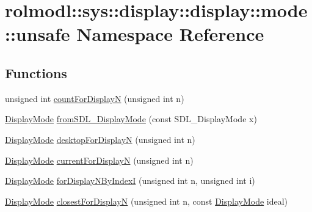 \hypertarget{namespacerolmodl_1_1sys_1_1display_1_1display_1_1mode_1_1unsafe}{}\section{rolmodl\+::sys\+::display\+::display\+::mode\+::unsafe Namespace Reference}
\label{namespacerolmodl_1_1sys_1_1display_1_1display_1_1mode_1_1unsafe}
\subsection*{Functions}
\begin{DoxyCompactItemize}
\item 
unsigned int \mbox{\hyperlink{namespacerolmodl_1_1sys_1_1display_1_1display_1_1mode_1_1unsafe_a44b5325fbd365260f9ad80c6131887b1}{count\+For\+DisplayN}} (unsigned int n)
\item 
\mbox{\hyperlink{structrolmodl_1_1sys_1_1display_1_1display_1_1mode_1_1_display_mode}{Display\+Mode}} \mbox{\hyperlink{namespacerolmodl_1_1sys_1_1display_1_1display_1_1mode_1_1unsafe_aafbeb017866f37950cd58c04d25b7449}{from\+S\+D\+L\+\_\+\+Display\+Mode}} (const S\+D\+L\+\_\+\+Display\+Mode x)
\item 
\mbox{\hyperlink{structrolmodl_1_1sys_1_1display_1_1display_1_1mode_1_1_display_mode}{Display\+Mode}} \mbox{\hyperlink{namespacerolmodl_1_1sys_1_1display_1_1display_1_1mode_1_1unsafe_ac28160e54f640dba87cb719ea71d759a}{desktop\+For\+DisplayN}} (unsigned int n)
\item 
\mbox{\hyperlink{structrolmodl_1_1sys_1_1display_1_1display_1_1mode_1_1_display_mode}{Display\+Mode}} \mbox{\hyperlink{namespacerolmodl_1_1sys_1_1display_1_1display_1_1mode_1_1unsafe_a0bd35b1e877e5f2eceb677bc07347829}{current\+For\+DisplayN}} (unsigned int n)
\item 
\mbox{\hyperlink{structrolmodl_1_1sys_1_1display_1_1display_1_1mode_1_1_display_mode}{Display\+Mode}} \mbox{\hyperlink{namespacerolmodl_1_1sys_1_1display_1_1display_1_1mode_1_1unsafe_ac971adb48d9bffe0e2a9f8ef270e3364}{for\+Display\+N\+By\+IndexI}} (unsigned int n, unsigned int i)
\item 
\mbox{\hyperlink{structrolmodl_1_1sys_1_1display_1_1display_1_1mode_1_1_display_mode}{Display\+Mode}} \mbox{\hyperlink{namespacerolmodl_1_1sys_1_1display_1_1display_1_1mode_1_1unsafe_afccdeb045344d9ceda8ae0233aa36598}{closest\+For\+DisplayN}} (unsigned int n, const \mbox{\hyperlink{structrolmodl_1_1sys_1_1display_1_1display_1_1mode_1_1_display_mode}{Display\+Mode}} ideal)
\end{DoxyCompactItemize}


